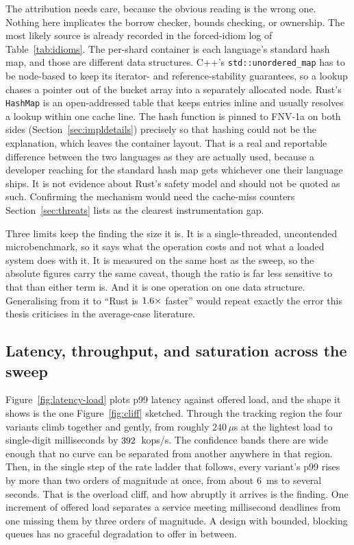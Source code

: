 \documentclass[english,oneside,a4paper,censored,csm,software-track-2020]{HYthesisML}
\begin{document}
The attribution needs care, because the obvious reading is the wrong one. Nothing here
implicates the borrow checker, bounds checking, or ownership. The most likely source is
already recorded in the forced-idiom log of Table~\ref{tab:idioms}. The per-shard container is
each language's standard hash map, and those are different data structures. C++'s
\texttt{std::unordered\_map} has to be node-based to keep its iterator- and reference-stability
guarantees, so a lookup chases a pointer out of the bucket array into a separately allocated
node. Rust's \texttt{HashMap} is an open-addressed table that keeps entries inline and
usually resolves a lookup within one cache line. The hash function is pinned to FNV-1a on both
sides (Section~\ref{sec:impldetails}) precisely so that hashing could not be the explanation,
which leaves the container layout. That is a real and reportable difference between the two
languages as they are actually used, because a developer reaching for the standard hash map gets
whichever one their language ships. It is not evidence about Rust's safety model and should
not be quoted as such. Confirming the mechanism would need the cache-miss counters
Section~\ref{sec:threats} lists as the clearest instrumentation gap.

Three limits keep the finding the size it is. It is a single-threaded, uncontended
microbenchmark, so it says what the operation costs and not what a loaded system does with it.
It is measured on the same host as the sweep, so the absolute figures carry the
same caveat, though the ratio is far less sensitive to that than either term is. And it is one
operation on one data structure. Generalising from it to ``Rust is $1.6\times$
faster'' would repeat exactly the error this thesis criticises in the average-case literature.

\subsection{Latency, throughput, and saturation across the sweep}
Figure~\ref{fig:latency-load} plots p99 latency against offered load, and the shape it shows is
the one Figure~\ref{fig:cliff} sketched. Through the tracking region the four variants climb
together and gently, from roughly $240\,\mu$s at the lightest load to single-digit milliseconds
by $392$~kops/s. The confidence bands there are wide enough that no curve can be separated
from another anywhere in that region. Then, in the single step of the rate ladder that follows,
every variant's p99 rises by more than two orders of magnitude at once, from about $6$~ms to
several seconds. That is the overload cliff, and how abruptly it arrives is the finding. One
increment of offered load separates a service meeting millisecond deadlines from one missing them
by three orders of magnitude. A design with bounded, blocking queues has no graceful degradation
to offer in between.
\end{document}
